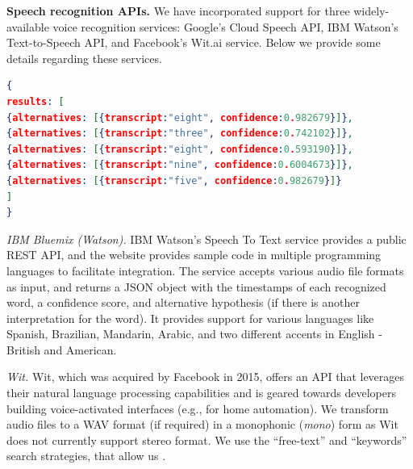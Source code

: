 
\textbf{Speech recognition APIs.}
We have incorporated support for three widely-available voice recognition services: Google's Cloud Speech API,
IBM Watson's Text-to-Speech API, and Facebook's Wit.ai service. Below we 
provide some details regarding these services.

\begin{lstlisting}[language=json,firstnumber=1,caption={Example response from IBM Watson's API for an audio challenge from Google \re v2.a.},label={lst:IBM}]
{
results: [
{alternatives: [{transcript:"eight", confidence:0.982679}]},
{alternatives: [{transcript:"three", confidence:0.742102}]},
{alternatives: [{transcript:"eight", confidence:0.593190}]},
{alternatives: [{transcript:"nine", confidence:0.6004673}]},
{alternatives: [{transcript:"five", confidence:0.982679}]}
]
}

\end{lstlisting}

\emph{IBM Bluemix (Watson).} IBM Watson's Speech To Text service provides a public REST API, and the website provides 
sample code in multiple programming languages to facilitate integration.
The service accepts various audio file formats as input, and returns a JSON object
with the timestamps of each recognized word, a confidence score, and alternative hypothesis (if there is 
another interpretation for the word). It provides support for various languages 
like Spanish, Brazilian, Mandarin, Arabic, and two different accents in English - British and American.

\emph{Wit.} Wit, which was acquired by Facebook in 2015, offers an API that leverages their natural language processing
capabilities and is geared towards developers building voice-activated interfaces (e.g., for home automation). We transform 
audio files to a WAV format (if required) in a monophonic (\emph{mono}) form as Wit does not currently support stereo format.
We use the ``free-text'' and ``keywords'' search strategies, that allow us .

